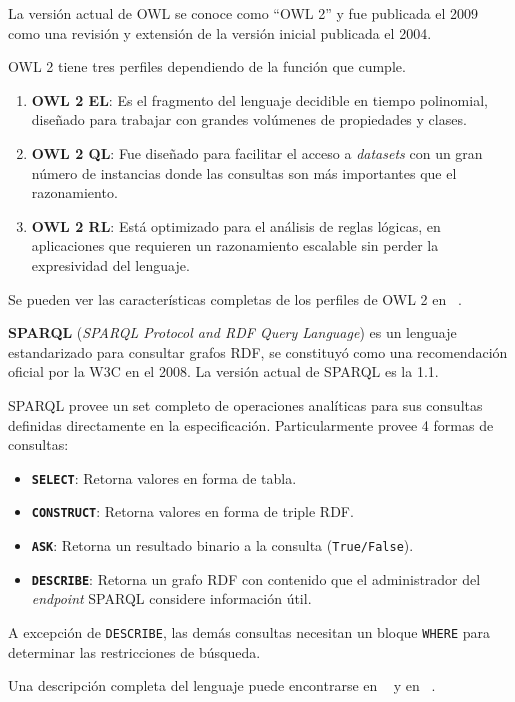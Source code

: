 \documentclass[spanish, fleqn, twocolumn]{IEEEtran/IEEEtran}
\renewcommand{\tt}[1]{\texttt{#1}}
\renewcommand{\bf}[1]{\textbf{#1}}
\begin{document}
La versión actual de OWL se conoce como ``OWL 2'' y fue publicada el 2009 como 
una revisión y extensión de la versión inicial publicada el
2004\cite{bikakis2013semantic}.

OWL 2 tiene tres perfiles dependiendo de la función que cumple.
\begin{enumerate}
  \item \bf{OWL 2 EL}: 
    Es el fragmento del lenguaje decidible en tiempo polinomial, diseñado para
    trabajar con grandes volúmenes de propiedades y clases.
  \item \bf{OWL 2 QL}:
    Fue diseñado para facilitar el acceso a \emph{datasets} con un gran número
    de instancias donde las consultas son más importantes que el razonamiento.
  \item \bf{OWL 2 RL}:
    Está optimizado para el análisis de reglas lógicas, en aplicaciones que
    requieren un razonamiento escalable sin perder la expresividad del lenguaje.
\end{enumerate}
Se pueden ver las características completas de los perfiles de OWL 2 en
~\cite{motik2009owlprofiles}.

\bf{SPARQL} (\emph{SPARQL Protocol and RDF Query Language}) es un lenguaje
estandarizado para consultar grafos RDF, se constituyó como una recomendación
oficial por la W3C en el 2008\cite{bikakis2013semantic}. La versión actual de
SPARQL es la 1.1\cite{world2013sparql}.

SPARQL provee un set completo de operaciones analíticas para sus consultas
definidas directamente en la especificación. Particularmente provee 4 formas de
consultas:
\begin{itemize}
  \item \bf{\tt{SELECT}}:
    Retorna valores en forma de tabla.
  \item \bf{\tt{CONSTRUCT}}:
    Retorna valores en forma de triple RDF.
  \item \bf{\tt{ASK}}:
    Retorna un resultado binario a la consulta (\tt{True/False}).
  \item \bf{\tt{DESCRIBE}}:
    Retorna un grafo RDF con contenido que el administrador del \emph{endpoint}
    SPARQL considere información útil.
\end{itemize}
A excepción de \tt{DESCRIBE}, las demás consultas necesitan un bloque \tt{WHERE}
para determinar las restricciones de búsqueda.

Una descripción completa del lenguaje puede
encontrarse en ~\cite{prud2008sparql} y en ~\cite{world2013sparql}.
\end{document}
